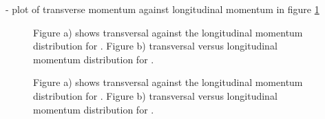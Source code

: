 - plot of transverse momentum against longitudinal momentum in figure \ref{fig:MC_lambda0_pt_vs_pz}%

\begin{figure}
	\caption{Figure a) shows transversal against the longitudinal momentum distribution for \lam. Figure b) 
			transversal versus longitudinal momentum distribution for \alam.}
	\label{fig:MC_lambda0_pt_vs_pz}
\end{figure}


\begin{figure}
	\caption{Figure a) shows transversal against the longitudinal momentum distribution for \anticascade. Figure b) 
			transversal versus longitudinal momentum distribution for \excitedcascade.}
	\label{fig:MC_xi_pt_vs_pz}
\end{figure}

